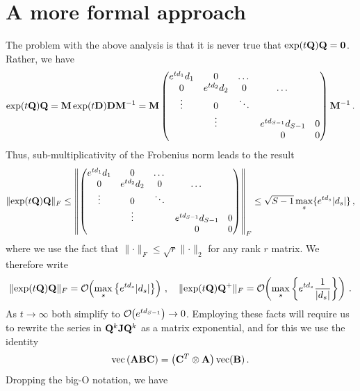 \documentclass[12pt]{article} %
\newcommand{\order}[1]{{\cal O}\hspace{-0.2em}\left( #1 \right)}
\begin{document}
\section{A more formal approach}

The problem with the above analysis is that it is never true that $\exp(t\mathbf{Q})\mathbf{Q}=\boldsymbol{0}$.  Rather, we have
\begin{align*}
	\exp(t\mathbf{Q})\mathbf{Q} = \mathbf{M} \exp(t\mathbf{D}) \mathbf{D} \mathbf{M}^{-1} =  \mathbf{M} \begin{pmatrix}
	e^{td_1}	d_1& 0 &\dots & & \\
		0  & e^{td_2}d_2 &0  & \dots& \\
		\vdots &0 & \ddots & \\
		& \vdots& & e^{td_{S-1}}d_{S-1} &0 \\
		&&&0&0
	\end{pmatrix} \mathbf{M}^{-1} \, .
\end{align*}
Thus, sub-multiplicativity of the Frobenius norm leads to the result
\begin{align*}
	\lVert \exp(t\mathbf{Q})\mathbf{Q} \rVert_F \leq \left\Vert  \begin{pmatrix}
		e^{td_1}	d_1& 0 &\dots & & \\
		0  & e^{td_2}d_2 &0  & \dots& \\
		\vdots &0 & \ddots & \\
		& \vdots& & e^{td_{S-1}}d_{S-1} &0 \\
		&&&0&0
	\end{pmatrix}  \right\Vert_F \leq \sqrt{S-1} \max_s \{e^{td_{s}} |d_{s}| \} \, ,
\end{align*}
where we  use the fact that $\lVert \cdot \rVert_F \leq \sqrt{r} \lVert \cdot \rVert_2$ for any rank $r$ matrix.  We therefore write
\begin{align}
	\lVert \exp(t\QQ)\QQ \rVert_F = \order{\max_s \left\{e^{td_{s}} |d_{s}| \right\}} \,,  \quad 	\lVert \exp(t\QQ)\QQ^+ \rVert_F = \order{\max_s \left\{e^{td_{s}} \frac{1}{|d_{s}|} \right\}} \, .
\end{align}
As $t\rightarrow \infty$ both simplify to $\order{e^{td_{S-1}}}\rightarrow 0$.  Employing these facts will require us to rewrite the series in $\mathbf{Q}^k \mathbf{J} \mathbf{Q}^k $ as a matrix exponential, and for this we use the identity
\begin{align*}
	\mbox{vec} \left(\mathbf{A} \mathbf{B} \mathbf{C} \right) = \left( \mathbf{C}^T \otimes \mathbf{A} \right) \mbox{vec} (\mathbf{B}) \, .
\end{align*}
Dropping the big-O notation, we have
\end{document}
